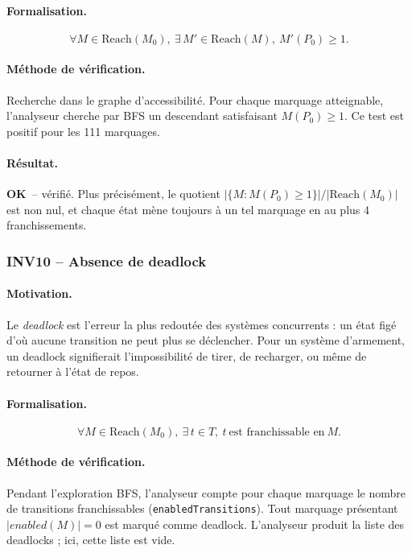 \documentclass[11pt,a4paper]{article}
\newcommand{\code}[1]{\texttt{#1}}
\newcommand{\OK}{\textcolor{green!50!black}{\textbf{OK}}}
\begin{document}
\paragraph{Formalisation.}
\[
\forall M \in \mathrm{Reach}(M_0),\ \exists\, M' \in \mathrm{Reach}(M),\ M'(P_0) \geq 1.
\]

\paragraph{Méthode de vérification.}
Recherche dans le graphe d'accessibilité. Pour chaque marquage atteignable,
l'analyseur cherche par BFS un descendant satisfaisant $M(P_0) \geq 1$. Ce
test est positif pour les 111 marquages.

\paragraph{Résultat.}
\OK\ -- vérifié. Plus précisément, le quotient
$|\{M : M(P_0) \geq 1\}| / |\mathrm{Reach}(M_0)|$ est non nul, et chaque
état mène toujours à un tel marquage en au plus 4 franchissements.

\subsubsection*{INV10 -- Absence de deadlock}

\paragraph{Motivation.}
Le \emph{deadlock} est l'erreur la plus redoutée des systèmes concurrents :
un état figé d'où aucune transition ne peut plus se déclencher. Pour un
système d'armement, un deadlock signifierait l'impossibilité de tirer, de
recharger, ou même de retourner à l'état de repos.

\paragraph{Formalisation.}
\[
\forall M \in \mathrm{Reach}(M_0),\ \exists\, t \in T,\ t\ \text{est franchissable en}\ M.
\]

\paragraph{Méthode de vérification.}
Pendant l'exploration BFS, l'analyseur compte pour chaque marquage le
nombre de transitions franchissables (\code{enabledTransitions}). Tout
marquage présentant $|\textit{enabled}(M)| = 0$ est marqué comme deadlock.
L'analyseur produit la liste des deadlocks ; ici, cette liste est vide.
\end{document}
